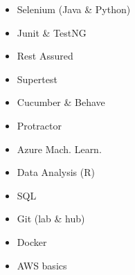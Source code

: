 \documentclass[9pt]{developercv} %
\begin{document}
\vspace{0.5cm}


	
\begin{minipage}[t]{0.5\textwidth} %
	\vspace{-\baselineskip} %
	\begin{barchart}{5.5}
	\end{barchart}
\end{minipage}
\hfill %
\begin{minipage}[t]{0.53\textwidth} %
	\vspace{-\baselineskip} %
		
		\begin{minipage}[t]{0.5\textwidth}
			\begin{itemize}[label={\large\textbullet}]
				\setlength\itemsep{0.01em}
				\item Selenium (Java \& Python)
				\item Junit \& TestNG 
				\item Rest Assured
				\item Supertest
				\item Cucumber \& Behave
				\item Protractor
			\end{itemize}
		\end{minipage}
		\begin{minipage}[t]{0.5\textwidth}
			\begin{itemize}
				\setlength\itemsep{0.01em}
				\item Azure Mach. Learn.
				\item Data Analysis (R)
				\item SQL
				\item Git (lab \& hub)
				\item Docker
				\item AWS basics
			\end{itemize}
	\end{minipage}
\end{minipage}
%
\end{document}
